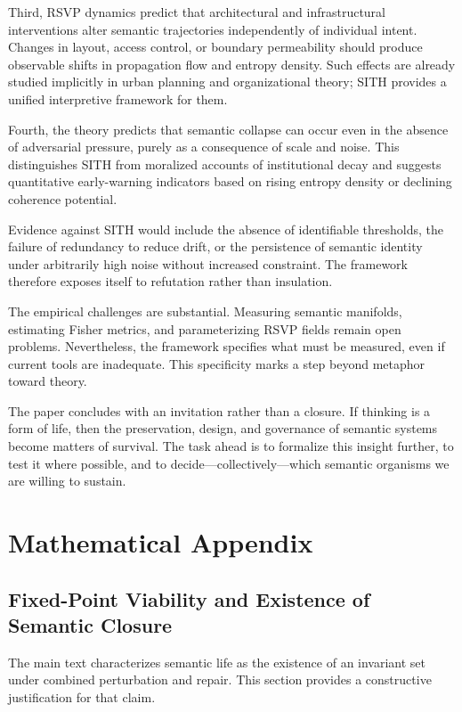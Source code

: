 \documentclass[11pt,oneside]{article}
\begin{document}
Third, RSVP dynamics predict that architectural and infrastructural interventions alter semantic trajectories independently of individual intent. Changes in layout, access control, or boundary permeability should produce observable shifts in propagation flow and entropy density. Such effects are already studied implicitly in urban planning and organizational theory; SITH provides a unified interpretive framework for them.

Fourth, the theory predicts that semantic collapse can occur even in the absence of adversarial pressure, purely as a consequence of scale and noise. This distinguishes SITH from moralized accounts of institutional decay and suggests quantitative early-warning indicators based on rising entropy density or declining coherence potential.

Evidence against SITH would include the absence of identifiable thresholds, the failure of redundancy to reduce drift, or the persistence of semantic identity under arbitrarily high noise without increased constraint. The framework therefore exposes itself to refutation rather than insulation.

The empirical challenges are substantial. Measuring semantic manifolds, estimating Fisher metrics, and parameterizing RSVP fields remain open problems. Nevertheless, the framework specifies what must be measured, even if current tools are inadequate. This specificity marks a step beyond metaphor toward theory.

The paper concludes with an invitation rather than a closure. If thinking is a form of life, then the preservation, design, and governance of semantic systems become matters of survival. The task ahead is to formalize this insight further, to test it where possible, and to decide—collectively—which semantic organisms we are willing to sustain.

\newpage
\appendix
\section{Mathematical Appendix}

\subsection{Fixed-Point Viability and Existence of Semantic Closure}

The main text characterizes semantic life as the existence of an invariant set under combined perturbation and repair. This section provides a constructive justification for that claim.
\end{document}
